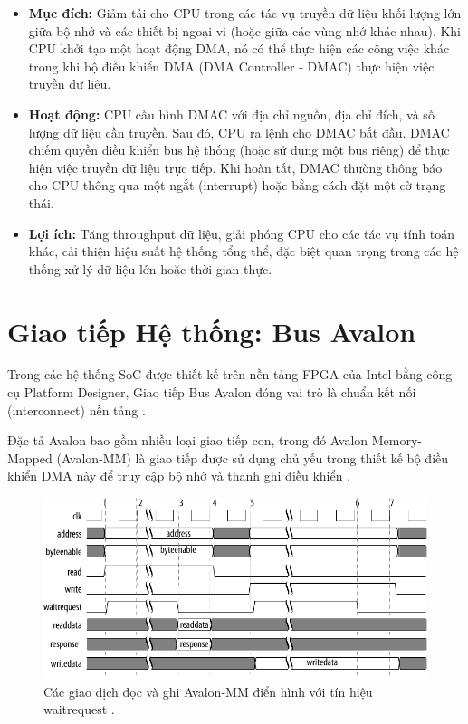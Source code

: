 \begin{itemize}
    \item \textbf{Mục đích:} Giảm tải cho CPU trong các tác vụ truyền dữ liệu khối lượng lớn giữa bộ nhớ và các thiết bị ngoại vi (hoặc giữa các vùng nhớ khác nhau). Khi CPU khởi tạo một hoạt động DMA, nó có thể thực hiện các công việc khác trong khi bộ điều khiển DMA (DMA Controller - DMAC) thực hiện việc truyền dữ liệu.
    \item \textbf{Hoạt động:} CPU cấu hình DMAC với địa chỉ nguồn, địa chỉ đích, và số lượng dữ liệu cần truyền. Sau đó, CPU ra lệnh cho DMAC bắt đầu. DMAC chiếm quyền điều khiển bus hệ thống (hoặc sử dụng một bus riêng) để thực hiện việc truyền dữ liệu trực tiếp. Khi hoàn tất, DMAC thường thông báo cho CPU thông qua một ngắt (interrupt) hoặc bằng cách đặt một cờ trạng thái.
    \item \textbf{Lợi ích:} Tăng throughput dữ liệu, giải phóng CPU cho các tác vụ tính toán khác, cải thiện hiệu suất hệ thống tổng thể, đặc biệt quan trọng trong các hệ thống xử lý dữ liệu lớn hoặc thời gian thực.
\end{itemize}

\section{Giao tiếp Hệ thống: Bus Avalon}
\label{sec:avalon_bus}
Trong các hệ thống SoC được thiết kế trên nền tảng FPGA của Intel bằng công cụ Platform Designer, Giao tiếp Bus Avalon đóng vai trò là chuẩn kết nối (interconnect) nền tảng \cite{avalon_mm_transfer}. 

Đặc tả Avalon bao gồm nhiều loại giao tiếp con, trong đó Avalon Memory-Mapped (Avalon-MM) là giao tiếp được sử dụng chủ yếu trong thiết kế bộ điều khiển DMA này để truy cập bộ nhớ và thanh ghi điều khiển \cite{avalon_mm_transfer}.

\begin{figure}[htbp]
    \centering
    \includegraphics[width=\linewidth]{Images/02_01_Avalon_MM_Transfers.pdf}
    \caption{Các giao dịch đọc và ghi Avalon-MM điển hình với tín hiệu waitrequest \cite{avalon_mm_transfer}.}
    \label{fig:02_01_avalon_mm_transfer}
\end{figure}


